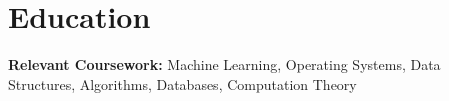 \section*{Education}

\textbf{Relevant Coursework:} Machine Learning, Operating Systems, Data Structures, Algorithms, Databases, Computation Theory
